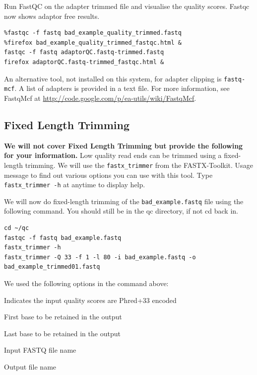 \begin{advanced}
\begin{steps}
Run FastQC on the adapter trimmed file and visualise the quality scores. Fastqc now shows adaptor free results.

\begin{lstlisting}
%fastqc -f fastq bad_example_quality_trimmed.fastq
%firefox bad_example_quality_trimmed_fastqc.html &
fastqc -f fastq adaptorQC.fastq-trimmed.fastq
firefox adaptorQC.fastq-trimmed_fastqc.html &
\end{lstlisting}
\end{steps}

\begin{note}
An alternative tool, not installed on this system, for adapter clipping is
\texttt{fastq-mcf}. A list of adapters is provided in a text file. For more
information, see FastqMcf at \url{http://code.google.com/p/ea-utils/wiki/FastqMcf}.
\end{note}

\subsection{Fixed Length Trimming}
\textbf{We will not cover Fixed Length Trimming but
provide the following for your information.}
Low quality read ends can be trimmed using a fixed-length trimming. We will use the
\texttt{fastx\_trimmer} from the FASTX-Toolkit. Usage message to find out various options
you can use with this tool. Type \texttt{fastx\_trimmer -h} at anytime to display help.

\begin{steps}
We will now do fixed-length trimming of the \texttt{bad\_example.fastq} file
using the following command. You should still be in the qc directory, if not cd back in.
\begin{lstlisting}
cd ~/qc
fastqc -f fastq bad_example.fastq 
fastx_trimmer -h
fastx_trimmer -Q 33 -f 1 -l 80 -i bad_example.fastq -o bad_example_trimmed01.fastq
\end{lstlisting}
\end{steps}

\begin{note}
We used the following options in the command above:
\begin{description}[style=multiline,labelindent=0cm,align=right,leftmargin=\descriptionlabelspace,rightmargin=1.5cm,font=\ttfamily]
 \item[-Q 33] Indicates the input quality scores are Phred+33 encoded
 \item[-f] First base to be retained in the output
 \item[-l] Last base to be retained in the output
 \item[-i] Input FASTQ file name
 \item[-o] Output file name
\end{description}
\end{note}


\end{advanced}
